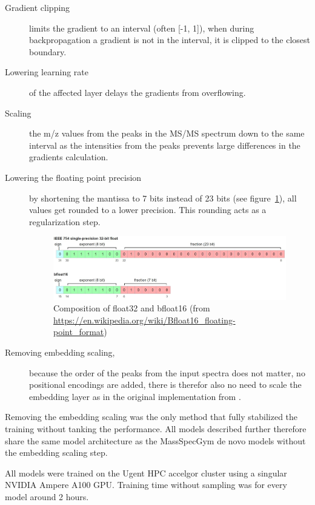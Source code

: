 \begin{description}
    \item[Gradient clipping]limits the gradient to an interval (often [-1, 1]),
    when during backpropagation a gradient is not in the interval,
    it is clipped to the closest boundary.
    \item[Lowering learning rate]of the affected layer delays the gradients from overflowing.
    \item[Scaling] the m/z values from the peaks in the \ac{MS/MS} spectrum down to the same interval as the intensities from the peaks prevents large differences in the gradients calculation.
    \item[Lowering the floating point precision]by shortening the mantissa to 7 bits instead of 23 bits (see figure~\ref{fig:bf16}), 
    all values get rounded to a lower precision. This rounding acts as a regularization step.
    \begin{figure}[h]
        \centering
        \includegraphics[width=\linewidth]{figures/methods/bf16.JPG}
        \caption{Composition of float32 and bfloat16 (from \url{https://en.wikipedia.org/wiki/Bfloat16_floating-point_format})}
        \label{fig:bf16}
    \end{figure}
    \item[Removing embedding scaling,]because the order of the peaks from the input spectra does not matter,
    no positional encodings are added, there is therefor also no need to scale the embedding layer as in the original implementation from \textcite{vaswani2017attention}.
\end{description}

Removing the embedding scaling was the only method that fully stabilized the training without tanking the performance.
All models described further therefore share the same model architecture as the MassSpecGym de novo models without the embedding scaling step.

All models were trained on the Ugent \ac{HPC} accelgor cluster using a singular NVIDIA Ampere A100 GPU.
Training time without sampling was for every model around 2 hours. 

